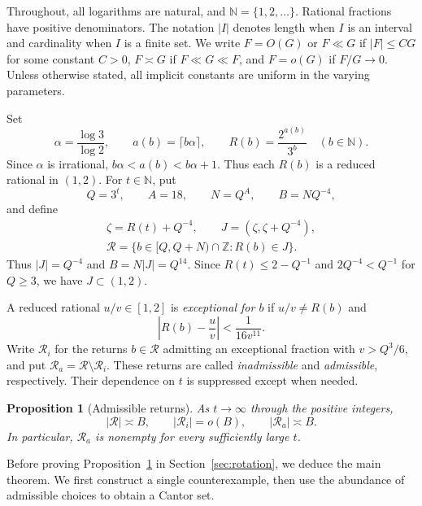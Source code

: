 \documentclass[11pt,reqno]{amsart}
\theoremstyle{definition}
\newcommand{\Z}{\mathbb Z}
\theoremstyle{plain}
\newtheorem{proposition}[lemma]{Proposition}
\theoremstyle{definition}
\theoremstyle{remark}
\newcommand{\RR}{\mathcal R}
\begin{document}
Throughout, all logarithms are natural, and
$\mathbb N=\{1,2,\ldots\}$. Rational fractions have
positive denominators. The notation $|I|$ denotes
length when $I$ is an interval and cardinality when
$I$ is a finite set. We write $F=O(G)$ or $F\ll G$
if $|F|\le CG$ for some constant $C>0$,
$F\asymp G$ if $F\ll G\ll F$, and $F=o(G)$
if $F/G\to0$. Unless otherwise stated, all
implicit constants are uniform in the varying parameters.

Set
\[
 \alpha=\frac{\log3}{\log2},\qquad
 a(b)=\lceil b\alpha\rceil,\qquad
 R(b)=\frac{2^{a(b)}}{3^b}
 \quad(b\in\mathbb N).
\]
Since $\alpha$ is irrational,
$b\alpha<a(b)<b\alpha+1$. Thus each $R(b)$ is
a reduced rational in $(1,2)$. For $t\in\mathbb N$, put
\[
 Q=3^t,\qquad A=18,\qquad N=Q^A,\qquad B=NQ^{-4},
\]
and define
\[
 \begin{gathered}
 \zeta=R(t)+Q^{-4},\qquad J=(\zeta,\zeta+Q^{-4}),\\
 \RR=\{b\in[Q,Q+N)\cap\Z:R(b)\in J\}.
 \end{gathered}
\]
Thus $|J|=Q^{-4}$ and $B=N|J|=Q^{14}$.
Since $R(t)\le2-Q^{-1}$ and $2Q^{-4}<Q^{-1}$
for $Q\ge3$, we have $J\subset(1,2)$.

A reduced rational $u/v\in[1,2]$ is
\emph{exceptional for $b$} if $u/v\ne R(b)$ and
\begin{equation}\label{eq:exceptional}
 \left|R(b)-\frac uv\right|<\frac1{16v^{11}}.
\end{equation}
Write $\RR_i$ for the returns $b\in\RR$ admitting
an exceptional fraction with $v>Q^3/6$, and put
$\RR_a=\RR\setminus\RR_i$. These returns are called
\emph{inadmissible} and \emph{admissible}, respectively.
Their dependence on $t$ is suppressed except when needed.

\begin{proposition}[Admissible returns]\label{prop:count}
As $t\to\infty$ through the positive integers,
\[
 |\RR|\asymp B,\qquad
 |\RR_i|=o(B),\qquad
 |\RR_a|\asymp B.
\]
In particular, $\RR_a$ is nonempty for every
sufficiently large $t$.
\end{proposition}

Before proving Proposition~\ref{prop:count} in
Section~\ref{sec:rotation}, we deduce the main theorem.
We first construct a single counterexample, then use
the abundance of admissible choices to obtain a Cantor set.
\end{document}
